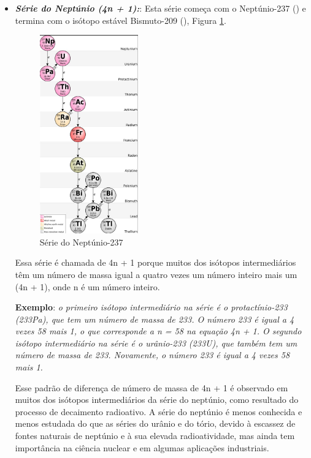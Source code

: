 \documentclass[11pt,a4paper]{article}
\begin{document}
\begin{itemize}
                    \item \textbf{\textit{\textcolor{CarnationPink}{Série do Neptúnio (4n + 1):}}}: Esta série começa com o Neptúnio-237 () e termina com o isótopo estável Bismuto-209 (), Figura \ref{fig:serieDoNeptunio}. 
                    
                        \begin{figure}[h]
                            \centering
                            \includegraphics[width=0.4\textwidth]{Imagens/serieDoNeptunio.jpg}
                            \caption{Série do Neptúnio-237}
                            \label{fig:serieDoNeptunio}
                        \end{figure}
                    
                        Essa série é chamada de 4n + 1 porque muitos dos isótopos intermediários têm um número de massa igual a quatro vezes um número inteiro mais um (4n + 1), onde n é um número inteiro.
                    
                        \textbf{Exemplo}: \textit{ o primeiro isótopo intermediário na série é o protactínio-233 (233Pa), que tem um número de massa de 233. O número 233 é igual a 4 vezes 58 mais 1, o que corresponde a n = 58 na equação 4n + 1. O segundo isótopo intermediário na série é o urânio-233 (233U), que também tem um número de massa de 233. Novamente, o número 233 é igual a 4 vezes 58 mais 1.}

                        Esse padrão de diferença de número de massa de 4n + 1 é observado em muitos dos isótopos intermediários da série do neptúnio, como resultado do processo de decaimento radioativo. A série do neptúnio é menos conhecida e menos estudada do que as séries do urânio e do tório, devido à escassez de fontes naturais de neptúnio e à sua elevada radioatividade, mas ainda tem importância na ciência nuclear e em algumas aplicações industriais.


\end{itemize}
\end{document}

